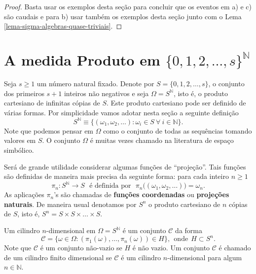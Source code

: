 \begin{proof}
Basta usar os exemplos desta seção para concluir que os eventos
em a) e c) são caudais e para b) usar também os exemplos desta
seção  junto com o Lema \ref{lema-sigma-algebras-quase-triviais}. 
\end{proof}



















\section{A medida Produto em $\{0,1,2,\ldots,s\}^{\mathbb{N}}$}

Seja $s\geq 1$ um número natural fixado. 
Denote por $S=\{0,1,2,\ldots,s\}$, 
o conjunto dos primeiros $s+1$ inteiros não negativos 
e seja $\Omega = S^{\mathbb{N}}$, isto é,
o produto cartesiano de infinitas cópias de $S$. 
Este produto cartesiano pode ser definido 
de várias formas. Por simplicidade vamos 
adotar nesta seção a seguinte definição 
\[
S^{\mathbb{N}}
\equiv 
\{
	(\omega_1,\omega_2,\ldots)
	:\omega_i\in S\ \forall \ i\in \mathbb{N}
\}.
\]
Note que podemos pensar em $\Omega$ como 
o conjunto de todas as sequências tomando 
valores em $S$. O conjunto $\Omega$ é 
muitas vezes chamado na literatura de 
espaço simbólico.

Será de grande utilidade considerar algumas
funções de ``projeção''. 
Tais funções são definidas de maneira mais precisa
da seguinte forma: para cada inteiro $n\geq 1$
\[
	\pi_n: S^{\mathbb{N}}\to S
	\ \ \
	\text{é definida por}\ \ \
	\pi_n\big( (\omega_1,\omega_2,\ldots)  \big)
	=
	\omega_n.
\]
As aplicações $\pi_n$'s são chamadas de 
{\bf funções coordenadas} ou {\bf projeções naturais}.
De maneira usual denotamos por $S^n$ o produto cartesiano
de $n$ cópias de $S$, isto é, $S^n=S\times S\times\ldots \times S$.

Um cilindro $n$-dimensional em $\Omega=S^{\mathbb{N}}$ é um conjunto 
$\mathcal{C}$ da forma 
\[
\mathcal{C}
=
\{
\omega\in \Omega:
(\pi_1(\omega),\ldots,\pi_n(\omega)) \in H
\},
\ \ 
\text{onde}\ \ H\subset S^n.
\]
Note que $\mathcal{C}$ é um conjunto não-vazio 
se $H$ é não vazio.
Um conjunto $\mathcal{C}$ é chamado de 
um cilindro finito dimensional se $\mathcal{C}$
é um cilindro $n$-dimensional para algum $n\in\mathbb{N}$. 


